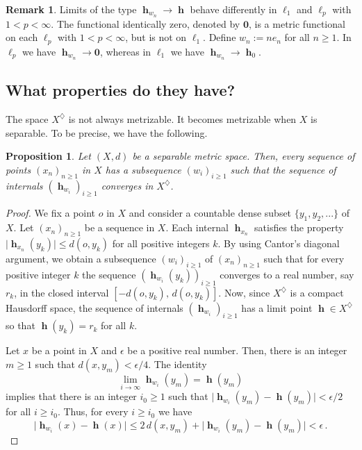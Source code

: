 \documentclass[a4paper,12pt]{article}
\newtheorem{prop}[thm]{Proposition}
\theoremstyle{definition}
\newtheorem{rem}[thm]{Remark}
\DeclareMathOperator{\h}{\mathbf{h}}
\newcommand{\abs}[1]{\lvert#1\rvert}
\numberwithin{equation}{section}
\begin{document}
\begin{rem}
Limits of the type $\h_{w_n} \rightarrow \h$ behave differently in $\ell_1$ and 
$\ell_p$ with $1<p<\infty$. The functional identically zero, denoted by $\mathbf{0}$, is a metric 
functional on each $\ell_p$ with $1<p<\infty$, but is not on $\ell_1$. Define $w_n:=ne_n$ for all 
$n\geq 1$. In $\ell_p$ we have $\h_{w_n}\rightarrow \mathbf{0}$, whereas in 
$\ell_1$ we have $\h_{w_n}\rightarrow \h_0$.
\end{rem}

\subsection{What properties do they have?}

The space $X^\diamondsuit$ is not always metrizable. It becomes metrizable when
$X$ is separable. To be precise, we have the following.
 
\begin{prop}
Let $(X,d)$ be a separable metric space. Then, every sequence of points 
$(x_n)_{n\geq 1}$ in $X$ has a subsequence $(w_{i})_{i\geq 1}$ such that the 
sequence of internals $(\h_{w_i})_{i\geq 1}$ converges in $X^\diamondsuit$.   
\end{prop}
	
\begin{proof}
We fix a point $o$ in $X$ and consider a countable dense subset $\{y_1, y_2, ...\}$ 
of $X$. Let $(x_n)_{n\geq 1}$ be a sequence in $X$. Each internal $\h_{x_n}$ 
satisfies the property $\abs{\h_{x_n}(y_k)} \leq d(o, y_k)$ for all positive 
integers $k$. By using Cantor's diagonal argument, we obtain a subsequence 
$(w_i)_{i\geq 1}$ of $(x_n)_{n\geq 1}$ such that for every positive integer $k$ 
the sequence $(\h_{w_i}(y_k))_{i\geq 1}$ converges to a real number, say $r_k$, 
in the closed interval $[-d(o,y_k),\,d(o,y_k)]$. Now, since $X^\diamondsuit$ is a 
compact Hausdorff space, the sequence of internals $(\h_{w_i})_{i\geq 1}$ has a 
limit point $\h\in X^\diamondsuit$ so that $\h(y_k)=r_k$ for all $k$.

Let $x$ be a point in $X$ and $\epsilon$ be a positive real number. Then, there 
is an integer $m\geq 1$ such that $d(x,y_m) < \epsilon /4$. The identity 
$$
	\lim_{i\to\infty}\h_{w_i}(y_m)=\h(y_m)
$$ 
implies that there is an integer $i_0 \geq 1$ such that 
$\abs{\h_{w_i}(y_m) - \h(y_m)} < \epsilon / 2$ for all $i\geq i_0$. Thus, for 
every $i\geq i_0$ we have
\begin{equation*}
	\abs{\h_{w_i}(x) - \h(x)}
	\leq 2\,d(x,y_m) + 
	\abs{\h_{w_i}(y_m) - \h(y_m)} < \epsilon\,. 
\end{equation*}
\end{proof}	
\end{document}
